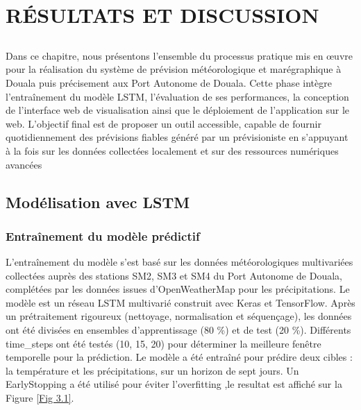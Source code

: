\documentclass[a4paper,12pt,openany]{report}
\begin{document}
	\chapter{RÉSULTATS ET DISCUSSION}
	\label{ch:résultatsetdiscussion} %
%	

%	
\section*{}
\quad Dans ce chapitre, nous présentons l'ensemble du processus pratique mis en œuvre pour la réalisation du système de prévision météorologique et marégraphique à Douala puis précisement aux Port Autonome de Douala. Cette phase intègre l'entraînement du modèle LSTM, l'évaluation de ses performances, la conception de l’interface web de visualisation ainsi que le déploiement de l’application sur le web. L'objectif final est de proposer un outil accessible, capable de fournir quotidiennement des prévisions fiables généré par un prévisioniste en s’appuyant à la fois sur les données collectées localement et sur des ressources numériques avancées

\section{Modélisation avec LSTM}

\subsection{Entraînement du modèle prédictif}

\quad L'entraînement du modèle s’est basé sur les données météorologiques multivariées collectées auprès des stations SM2, SM3 et SM4 du Port Autonome de Douala, complétées par les données issues d’OpenWeatherMap pour les précipitations. Le modèle est un réseau LSTM multivarié construit avec Keras et TensorFlow. Après un prétraitement rigoureux (nettoyage, normalisation et séquençage), les données ont été divisées en ensembles d’apprentissage (80 \%) et de test (20 \%).
Différents time\_steps ont été testés (10, 15, 20) pour déterminer la meilleure fenêtre temporelle pour la prédiction. Le modèle a été entraîné pour prédire deux cibles : la température et les précipitations, sur un horizon de sept jours. Un EarlyStopping a été utilisé pour éviter l’overfitting ,le resultat est affiché sur la Figure \ref{Fig 3.1}.
\end{document}
